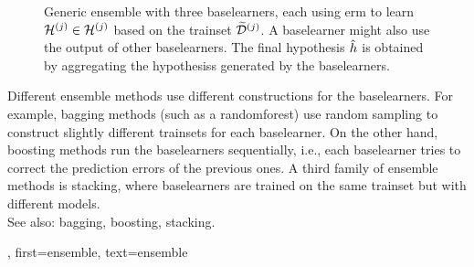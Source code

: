 {{\begin{figure}[H]
\begin{center}
		\caption{Generic ensemble with three \glspl{baselearner}, each  
			using \gls{erm} to learn $\mathcal{H}^{(j)} \in \mathcal{H}^{(j)}$ 
			based on the \gls{trainset} $\widetilde{\mathcal{D}}^{(j)}$. A \gls{baselearner} might also 
			use the \gls{output} of other \glspl{baselearner}. The final \gls{hypothesis} $\hat{h}$ 
			is obtained by aggregating the \glspl{hypothesis} generated by the \glspl{baselearner}.}
		\end{center}
		\end{figure}
		Different ensemble methods use different constructions for the \glspl{baselearner}. 
		For example, \gls{bagging} methods (such as a \gls{randomforest}) use random sampling to 
		construct slightly different \glspl{trainset} for each \gls{baselearner}. 
	    	On the other hand, \gls{boosting} methods run the \glspl{baselearner} 
		sequentially, i.e., each \gls{baselearner} tries to correct the \gls{prediction} 
		errors of the previous ones. A third family of ensemble methods is \gls{stacking}, 
		where \glspl{baselearner} are trained on the same \gls{trainset} but with 
		different \glspl{model}.
		\\
	 	See also: \gls{bagging}, \gls{boosting}, \gls{stacking}.},
	 first={ensemble},
	 text={ensemble} 
}

